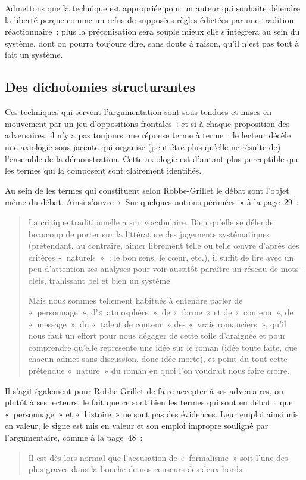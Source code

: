 Admettons que la technique est appropriée pour un auteur qui souhaite défendre la liberté perçue comme un refus de supposées règles édictées par une tradition réactionnaire~: plus la préconisation sera souple mieux elle s'intégrera au sein du système, dont on pourra toujours dire, sans doute à raison, qu'il n'est pas tout à fait un système.



\subsection{Des dichotomies structurantes}

Ces techniques qui servent l'argumentation sont sous-tendues et mises en mouvement par un jeu d'oppositions frontales~: et si à chaque proposition des adversaires, il n'y a pas toujours une réponse terme à terme~; le lecteur décèle une axiologie sous-jacente qui organise (peut-être plus qu'elle ne résulte de) l'ensemble de la démonstration. Cette axiologie est d'autant plus perceptible que les termes qui la composent sont clairement identifiés.

Au sein de \punr{}  les termes qui constituent selon Robbe-Grillet le débat sont l'objet même du débat. Ainsi s'ouvre «~Sur quelques notions périmées~» à la page~29~:
\begin{quote}
    La critique traditionnelle a son vocabulaire. Bien qu’elle se défende beaucoup de porter sur la littérature des jugements systématiques (prétendant, au contraire, aimer librement telle ou telle œuvre d’après des critères «~naturels~»~: le bon sens, le cœur, etc.), il suffit de lire avec un peu d’attention ses analyses pour voir aussitôt paraître un réseau de mots-clefs, trahissant bel et bien un système.

    Mais nous sommes tellement habitués à entendre parler de «~personnage~», d’«~atmosphère~», de «~forme~» et de «~contenu~», de «~message~», du «~talent de conteur~» des «~vrais romanciers~», qu’il nous faut un effort pour nous dégager de cette toile d’araignée et pour comprendre qu’elle représente une idée sur le roman (idée toute faite, que chacun admet sans discussion, donc idée morte), et point du tout cette prétendue «~nature~» du roman en quoi l’on voudrait nous faire croire.
\end{quote}
Il s'agit également pour Robbe-Grillet de faire accepter à ses adversaires, ou plutôt à ses lecteurs, le fait que ce sont bien les termes qui sont en débat~: que «~personnage~» et «~histoire~» ne sont pas des évidences. Leur emploi ainsi mis en valeur, le signe est mis en valeur et son emploi impropre souligné par l'argumentaire, comme à la page~48~:
\begin{quote}
    Il est dès lors normal que l'accusation de «~formalisme~» soit l'une des plus graves dans la bouche de nos censeurs des deux bords.
\end{quote}

